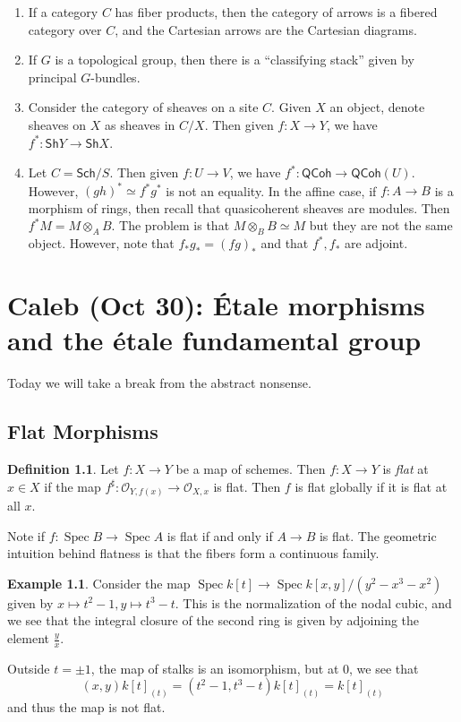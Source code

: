 \documentclass[leqno, openany]{memoir}
\theoremstyle{definition}
\newtheorem{defn}[thm]{Definition}
\newtheorem{exm}[thm]{Example}
\theoremstyle{remark}
\theoremstyle{plain}
\theoremstyle{definition}
\theoremstyle{remark}
\newcommand{\mc}[1]{\mathcal{#1}}
\newcommand{\ms}[1]{\mathsf{#1}}
\DeclareMathOperator{\Spec}{Spec}
\begin{document}
\begin{enumerate}
    \item If a category $C$ has fiber products, then the category of arrows is a fibered category over $C$, and the Cartesian arrows are the Cartesian diagrams.
    \item If $G$ is a topological group, then there is a ``classifying stack'' given by principal $G$-bundles.
    \item Consider the category of sheaves on a site $C$. Given $X$ an object, denote sheaves on $X$ as sheaves in $C / X$. Then given $f \colon X \to Y$, we have $f^* \colon \ms{Sh}Y \to \ms{Sh}X$.
    \item Let $C = \ms{Sch}/S$. Then given $f \colon U \to V$, we have $f^* \colon \ms{QCoh} \to \ms{QCoh}(U)$. However, $(gh)^* \simeq f^* g^*$ is not an equality. In the affine case, if $f \colon A \to B$ is a morphism of rings, then recall that quasicoherent sheaves are modules. Then $f^*M = M \otimes_A B$. The problem is that $M \otimes_B B \simeq M$ but they are not the same object. However, note that $f_* g_* = (fg)_*$ and that $f^*,f_*$ are adjoint.
\end{enumerate}

\chapter{Caleb (Oct 30): \'Etale morphisms and the \'etale fundamental group}%
\label{cha:caleb_oct_30_'etale_morphisms_and_the_'etale_fundamental_group}

Today we will take a break from the abstract nonsense.

\section{Flat Morphisms}%
\label{sec:flat_morphisms}

\begin{defn}
    Let $f \colon X \to Y$ be a map of schemes. Then $f \colon X \to Y$ is \textit{flat} at $x \in X$ if the map $f^{\sharp} \colon \mc{O}_{Y, f(x)} \to \mc{O}_{X,x}$ is flat. Then $f$ is flat globally if it is flat at all $x$.
\end{defn}

Note if $f \colon \Spec B \to \Spec A$ is flat if and only if $A \to B$ is flat. The geometric intuition behind flatness is that the fibers form a continuous family.

\begin{exm}
    Consider the map $\Spec k[t] \to \Spec k[x,y] / (y^2 - x^3 - x^2)$ given by $x \mapsto t^2-1, y \mapsto t^3-t$. This is the normalization of the nodal cubic, and we see that the integral closure of the second ring is given by adjoining the element $\frac{y}{x}$.

    Outside $t = \pm 1$, the map of stalks is an isomorphism, but at $0$, we see that
    \[ (x,y) k[t]_{(t)} = (t^2 - 1, t^3-t) k[t]_{(t)} = k[t]_{(t)} \]
    and thus the map is not flat.
\end{exm}
\end{document}
